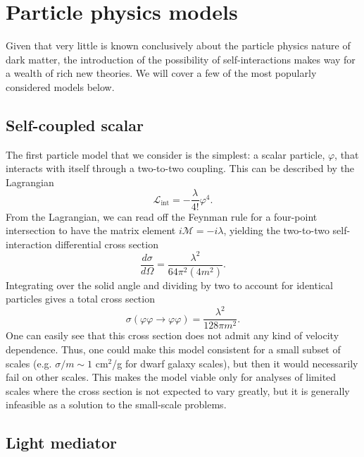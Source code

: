 \hypertarget{particle-physics-models}{%
\section{Particle physics models}\label{particle-physics-models}}

Given that very little is known conclusively about the particle physics
nature of dark matter, the introduction of the possibility of
self-interactions makes way for a wealth of rich new theories. We will
cover a few of the most popularly considered models below.

\hypertarget{self-coupled-scalar}{%
\subsection{Self-coupled scalar}\label{self-coupled-scalar}}

The first particle model that we consider is the simplest: a scalar
particle, $\varphi$, that interacts with itself through a two-to-two coupling.
This can be described by the Lagrangian
\begin{equation}
\mathcal{L}_{\text{int}} = -\frac{\lambda}{4!} \varphi^4.
\end{equation}
From the Lagrangian, we can read off the Feynman rule for a four-point
intersection to have the matrix element \(i\mathcal{M} = -i\lambda\), yielding
the two-to-two self-interaction differential cross section
\begin{equation}
\frac{d\sigma}{d\Omega} = \frac{\lambda^2}{64\pi^2 (4m^2)}.
\end{equation}
Integrating over the solid angle and dividing by two to account for identical
particles gives a total cross section
\begin{equation}
\sigma(\varphi\varphi\to\varphi\varphi) = \frac{\lambda^2}{128\pi m^2}.
\end{equation}
One can easily see that this cross section does not admit any kind of
velocity dependence. Thus, one could make this model consistent for a
small subset of scales (e.g. \(\sigma/m \sim 1\) cm\(^2\)/g for dwarf galaxy
scales), but then it would necessarily fail on other scales. This makes the
model viable only for analyses of limited scales where the cross section is
not expected to vary greatly, but it is generally infeasible as a solution to
the small-scale problems.

\hypertarget{light-mediator}{%
\subsection{Light mediator}\label{light-mediator}}

